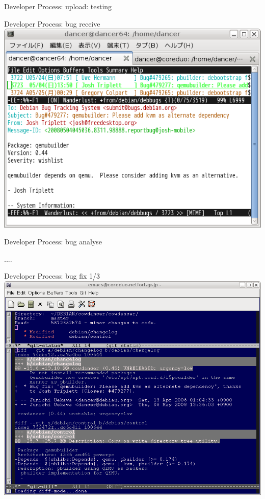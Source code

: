 \documentclass[cjk,dvipdfm,12pt]{beamer}
\begin{document}
\begin{frame}{Developer Process: upload: testing}
\begin{minipage}{0.4\hsize}
\end{minipage}
\end{frame}

\begin{frame}{Developer Process: bug receive}
 \includegraphics[width=1\hsize]{image200805/bug1.png}
\end{frame}

\begin{frame}{Developer Process: bug analyse}

....
\end{frame}

\begin{frame}{Developer Process: bug fix 1/3}
 \includegraphics[width=1\hsize]{image200805/bug2.png}
\end{frame}
\end{document}

